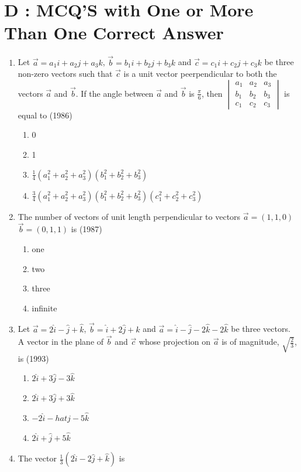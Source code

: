 \documentclass[12pt]{article}
\providecommand{\brak}[1]{\ensuremath{\left(#1\right)}}
\begin{document}
\section*{D  :  MCQ'S with One or More Than One Correct Answer}

\begin{enumerate}
\item Let $\vec{a}=a_1i+a_2j+a_3k$, $\vec{b}=b_1i+b_2j+b_3k$ and $\vec{c}=c_1i+c_2j+c_3k$ be three non-zero vectors such that $\vec{c}$ is a unit vector peerpendicular to both the vectors $\vec{a}$ and $\vec{b}$. If the angle between $\vec{a}$ and $\vec{b}$ is $\frac{\pi}{6}$, then 
$\begin{vmatrix}
 a_1  & a_2  & a_3\\
 b_1  & b_2  & b_3 \\
 c_1  & c_2  & c_3
\end{vmatrix}$      is equal to  (1986)
\begin{enumerate}
\item 0
\item 1
\item $\frac{1}{4}\brak{a_1^2+a_2^2+a_3^2}\brak{b_1^2+b_2^2+b_3^2}$
\item $\frac{3}{4}\brak{a_1^2+a_2^2+a_3^2}\brak{b_1^2+b_2^2+b_3^2}\brak{c_1^2+c_2^2+c_3^2}$
\end{enumerate}
\item The number of vectors of unit length perpendicular to vectors $\vec{a}=(1,1,0)$ $\vec{b}=(0,1,1)$ is (1987)
\begin{enumerate}
\item one 
\item two 
\item three
\item infinite 
\end{enumerate}
\item Let $\vec{a}=2\hat{i}-\hat{j}+\hat{k}$, $\vec{b}=\hat{i}+2\hat{j}+\hat{k}$ and $\vec{a}=\hat{i}-\hat{j}-2\hat{k}-2\hat{k}$ be three vectors. A vector in the plane of $\vec{b}$ and $\vec{c}$ whose projection on $\vec{a}$  is of magnitude, $\sqrt{\frac{2}{3}}$, is  (1993)
\begin{enumerate}
\item $2\hat{i}+3\hat{j}-3\hat{k}$
\item $2\hat{i}+3\hat{j}+3\hat{k}$
\item $-2\hat{i}-hat{j}-5\hat{k}$
\item $2\hat{i}+\hat{j}+5\hat{k}$
\end{enumerate}
\item The vector $\frac{1}{3}\brak{2\hat{i}-2\hat{j}+\hat{k}}$ is

\end{enumerate}
\end{document}

